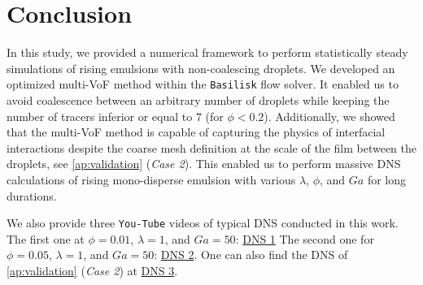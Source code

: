 \section{Conclusion}


In this study, we provided a numerical framework to perform statistically steady simulations of rising emulsions with non-coalescing droplets. 
We developed an optimized multi-VoF method within the \texttt{Basilisk} flow solver. 
It enabled us to avoid coalescence between an arbitrary number of droplets while keeping the number of tracers inferior or equal to $7$ (for $\phi < 0.2$). 
Additionally, we showed that the multi-VoF method is capable of capturing the physics of interfacial interactions despite the coarse mesh definition at the scale of the film between the droplets, see \ref{ap:validation} (\textit{Case 2}). 
This enabled us to perform massive DNS calculations of rising mono-disperse emulsion with various $\lambda$, $\phi$, and $Ga$ for long durations.

We also provide three \texttt{You-Tube} videos of typical DNS conducted in this work. 
The first one at $\phi = 0.01$, $\lambda = 1$, and $Ga = 50$: \href{https://youtube.com/shorts/R44HSADSUCc}{DNS 1}
The second one for $\phi=0.05$, $\lambda = 1$, and $Ga = 50$: \href{https://youtube.com/shorts/bGNlK2MV7p0}{DNS 2}. 
One can also find the DNS of \ref{ap:validation} (\textit{Case 2}) at \href{https://youtube.com/shorts/GhNfOf-Vbwo}{DNS 3}. 
